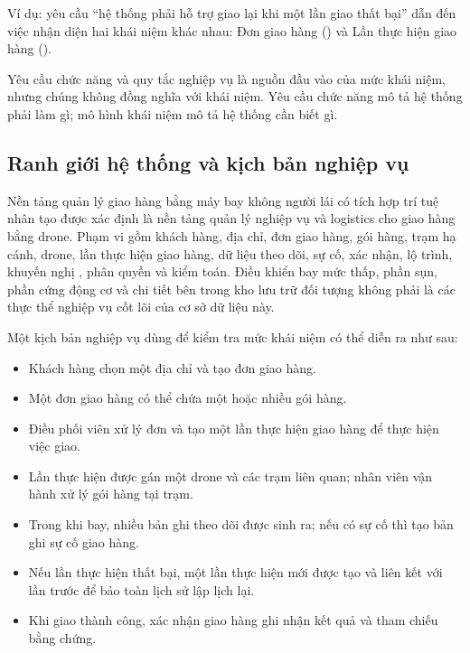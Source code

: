 Ví dụ: yêu cầu ``hệ thống phải hỗ trợ giao lại khi một lần giao thất bại'' dẫn đến việc nhận diện hai khái niệm khác nhau: Đơn giao hàng () và Lần thực hiện giao hàng ().

Yêu cầu chức năng và quy tắc nghiệp vụ là nguồn đầu vào của mức khái niệm, nhưng chúng không đồng nghĩa với khái niệm. Yêu cầu chức năng mô tả hệ thống phải làm gì; mô hình khái niệm mô tả hệ thống cần biết gì.

\subsection{Ranh giới hệ thống và kịch bản nghiệp vụ}

Nền tảng quản lý giao hàng bằng máy bay không người lái có tích hợp trí tuệ nhân tạo được xác định là nền tảng quản lý nghiệp vụ và logistics cho giao hàng bằng drone. Phạm vi gồm khách hàng, địa chỉ, đơn giao hàng, gói hàng, trạm hạ cánh, drone, lần thực hiện giao hàng, dữ liệu theo dõi, sự cố, xác nhận, lộ trình, khuyến nghị , phân quyền và kiểm toán. Điều khiển bay mức thấp, phần sụn, phần cứng động cơ và chi tiết bên trong kho lưu trữ đối tượng không phải là các thực thể nghiệp vụ cốt lõi của cơ sở dữ liệu này.

Một kịch bản nghiệp vụ dùng để kiểm tra mức khái niệm có thể diễn ra như sau:
\begin{itemize}
    \item Khách hàng chọn một địa chỉ và tạo đơn giao hàng.
    \item Một đơn giao hàng có thể chứa một hoặc nhiều gói hàng.
    \item Điều phối viên xử lý đơn và tạo một lần thực hiện giao hàng để thực hiện việc giao.
    \item Lần thực hiện được gán một drone và các trạm liên quan; nhân viên vận hành xử lý gói hàng tại trạm.
    \item Trong khi bay, nhiều bản ghi theo dõi được sinh ra; nếu có sự cố thì tạo bản ghi sự cố giao hàng.
    \item Nếu lần thực hiện thất bại, một lần thực hiện mới được tạo và liên kết với lần trước để bảo toàn lịch sử lập lịch lại.
    \item Khi giao thành công, xác nhận giao hàng ghi nhận kết quả và tham chiếu bằng chứng.
\end{itemize}


